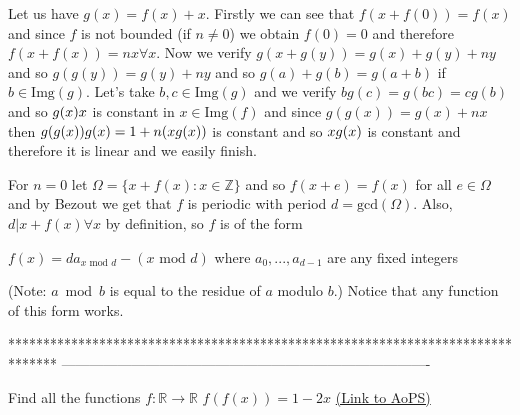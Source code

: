 \begin{solution}
	Let us have $g(x)=f(x)+x$. Firstly we can see that $f(x+f(0))=f(x)$ and since $f$ is not bounded (if $n\neq 0$) we obtain $f(0)=0$ and therefore $f(x+f(x))=nx \forall x$. Now we verify $g(x+g(y))=g(x)+g(y)+ny$ and so $g(g(y))=g(y)+ny$ and so $g(a)+g(b)=g(a+b)$ if $b \in \text{Img}(g)$. Let's take $b,c \in \text{Img}(g)$ and we verify $bg(c)=g(bc)=cg(b)$ and so $g(x)\/x$ is constant in $x \in \text{Img}(f)$ and since $g(g(x))=g(x)+nx$ then $g(g(x))\/g(x)=1+n(x\/g(x))$ is constant and so $x\/g(x)$ is constant and therefore it is linear and we easily finish.

For $n=0$ let $\Omega=\{x+f(x) : x \in \mathbb{Z} \}$ and so $f(x+e)=f(x)$ for all $e \in \Omega$ and by Bezout we get that $f$ is periodic with period $d = \text{gcd}(\Omega)$. Also, $d | x+f(x) \forall x$ by definition, so $f$ is of the form 

$f(x)=da_{x \text{ mod } d} - (x \text{ mod } d)$ where $a_0,...,a_{d-1}$ are any fixed integers 

(Note: $a \bmod b$ is equal to the residue of $a$ modulo $b$.) Notice that any function of this form works.
\end{solution}
*******************************************************************************
-------------------------------------------------------------------------------

\begin{problem}
	Find all the functions $ f:\mathbb{R}\rightarrow\mathbb{R} $
$ f(f(x)) = 1-2x $
	\flushright \href{https://artofproblemsolving.com/community/c6h469717}{(Link to AoPS)}
\end{problem}



